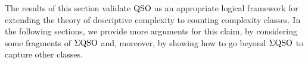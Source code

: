 The results of this section validate ${\rm QSO}$ as an appropriate logical framework for extending the theory of descriptive complexity to counting complexity classes. In the following sections, we provide more arguments for this claim, by considering some fragments of $\Sigma{\rm QSO}$ and, moreover, by showing how to go beyond $\Sigma{\rm QSO}$ to capture other 
classes.

